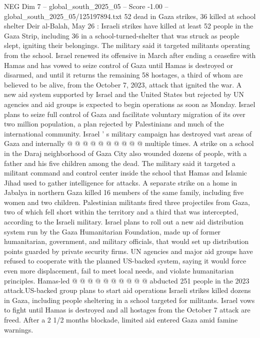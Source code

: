 \begin{textsample}{NEG Dim 7 – global\_south\_2025\_05 – Score -1.00 – global\_south\_2025\_05/125197894.txt}  \label{ex:f7_neg_016}
52 dead in Gaza strikes, 36 killed at school shelter Deir al-Balah, May 26 : Israeli strikes have killed at least 52 people in the Gaza Strip, including 36 in a school-turned-shelter that was struck as people slept, igniting their belongings.
The military said it targeted militants operating from the school.
Israel renewed its offensive in March after ending a ceasefire with Hamas and has vowed to seize control of Gaza until Hamas is destroyed or disarmed, and until it returns the remaining 58 hostages, a third of whom are believed to be alive, from the October 7, 2023, attack that ignited the war.
A new aid system supported by Israel and the United States but rejected by UN agencies and aid groups is expected to begin operations as soon as Monday.
Israel plans to seize full control of Gaza and facilitate voluntary migration of its over two million population, a plan rejected by Palestinians and much of the international community.
Israel ' s military campaign has destroyed vast areas of Gaza and internally @ @ @ @ @ @ @ @ @ @ multiple times.
A strike on a school in the Daraj neighborhood of Gaza City also wounded dozens of people, with a father and his five children among the dead.
The military said it targeted a militant command and control center inside the school that Hamas and Islamic Jihad used to gather intelligence for attacks.
A separate strike on a home in Jabalya in northern Gaza killed 16 members of the same family, including five women and two children.
Palestinian militants fired three projectiles from Gaza, two of which fell short within the territory and a third that was intercepted, according to the Israeli military.
Israel plans to roll out a new aid distribution system run by the Gaza Humanitarian Foundation, made up of former humanitarian, government, and military officials, that would set up distribution points guarded by private security firms.
UN agencies and major aid groups have refused to cooperate with the planned US-backed system, saying it would force even more displacement, fail to meet local needs, and violate humanitarian principles.
Hamas-led @ @ @ @ @ @ @ @ @ @ abducted 251 people in the 2023 attack.US-backed group plans to start aid operations Israeli strikes killed dozens in Gaza, including people sheltering in a school targeted for militants.
Israel vows to fight until Hamas is destroyed and all hostages from the October 7 attack are freed.
After a 2 1/2 months blockade, limited aid entered Gaza amid famine warnings.

\end{textsample}
